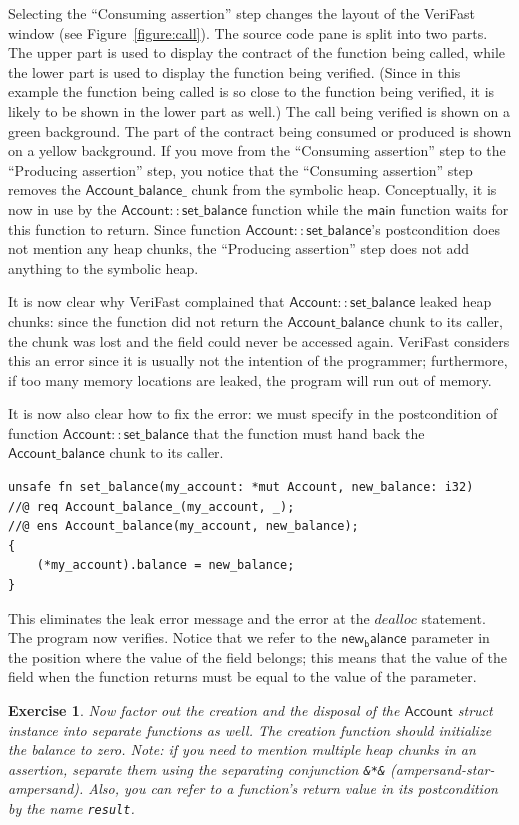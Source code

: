 \documentclass{article}
\newtheorem{exercise}{Exercise}
\begin{document}
Selecting the ``Consuming assertion'' step changes the layout
of the VeriFast window (see Figure~\ref{figure:call}).
The source code pane is split into two
parts. The upper part is used to display the contract of the
function being called, while the lower part is used to display
the function being verified. (Since in this example the
function being called is so close to the function being
verified, it is likely to be shown in the lower part as well.)
The call being verified is shown on a green background. The
part of the contract being consumed or produced is shown on a
yellow background. If you move from the ``Consuming assertion''
step to the ``Producing assertion'' step, you notice that the
``Consuming assertion'' step removes the
$\mathsf{Account\_balance\_}$ chunk from the symbolic heap.
Conceptually, it is now in use by the
$\mathsf{Account{::}set\_balance}$ function while the
$\mathsf{main}$ function waits for this function to return.
Since function $\mathsf{Account{::}set\_balance}$'s postcondition
does not mention any heap chunks, the ``Producing assertion''
step does not add anything to the symbolic heap.

It is now clear why VeriFast complained that
$\mathsf{Account{::}set\_balance}$ leaked heap chunks: since the
function did not return the $\mathsf{Account\_balance}$ chunk
to its caller, the chunk was lost and the field could never be
accessed again. VeriFast considers this an error since it is
usually not the intention of the programmer; furthermore, if
too many memory locations are leaked, the program will run out
of memory.

It is now also clear how to fix the error: we must specify in
the postcondition of function $\mathsf{Account{::}set\_balance}$
that the function must hand back the
$\mathsf{Account\_balance}$ chunk to its caller.
\begin{lstlisting}
unsafe fn set_balance(my_account: *mut Account, new_balance: i32)
//@ req Account_balance_(my_account, _);
//@ ens Account_balance(my_account, new_balance);
{
    (*my_account).balance = new_balance;
}
\end{lstlisting}
 This
eliminates the leak error message and the error at the
$\mathit{dealloc}$ statement. The program now verifies. Notice
that we refer to the $\mathsf{new_balance}$ parameter in the
position where the value of the field belongs; this means that
the value of the field when the function returns must be equal
to the value of the parameter.

\begin{exercise}\label{exercise:account}
Now factor out the creation and the disposal of the
$\mathsf{Account}$ struct instance into separate functions as
well. The creation function should initialize the balance to
zero. Note: if you need to mention multiple heap chunks in an
assertion, separate them using the \emph{separating conjunction}
\lstinline!&*&! (ampersand-star-ampersand). Also, you can refer
to a function's return value in its postcondition by the name
\lstinline!result!.
\end{exercise}
\end{document}
